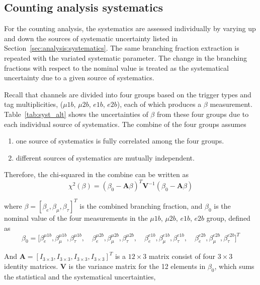 \FloatBarrier



\subsection{Counting analysis systematics}

For the counting analysis, the systematics are assessed individually by
varying up and down the sources of systematic uncertainty listed in
Section~\ref{sec:analysis:systematics}. The same branching fraction 
extraction is repeated with the variated systematic parameter.
The change in the branching fractions 
with respect to the nominal value is treated as the systematical uncertainty
due to a given source of systematics.

Recall that channels are divided into 
four groups based on the trigger types and \PQb tag multiplicities,
($\mu1b$, $\mu2b$, $e1b$, $e2b$), each of which produces a $\beta$ measurement. 
Table~\ref{tab:syst_alt} shows the 
uncertainties of $\beta$ from these four groups due to each individual source of systematics.
The combine of the four groups assumes
\begin{enumerate}
    \item one source of systematics is fully correlated among the four groups.
    \item different sources of systematics are mutually independent.
\end{enumerate}

\noindent Therefore, the chi-squared in the combine can be written as
\begin{equation}
    \chi^2 (\beta) = (\beta_0 - \textbf{A} \beta )^T \textbf{V}^{-1} (\beta_0 - \textbf{A} \beta )
\end{equation}

\noindent where $\beta = [\beta_e, \beta_\mu, \beta_\tau]^T $ is the combined branching fraction, and
$\beta_0$ is the nominal value of the four measurements in the $\mu1b$, $\mu2b$, $e1b$, $e2b$ group, defined as
% 
\begin{equation}
    \beta_0 = \bigg [
    \beta_e^{\mu1b}, \beta_\mu^{\mu1b}, \beta_\tau^{\mu1b}, \quad 
    \beta_e^{\mu2b}, \beta_\mu^{\mu2b}, \beta_\tau^{\mu2b}, \quad 
    \beta_e^{e1b}, \beta_\mu^{e1b}, \beta_\tau^{e1b}, \quad
    \beta_e^{e2b}, \beta_\mu^{e2b}, \beta_\tau^{e2b}
    \bigg ]^T
\end{equation}

\noindent And $\textbf{A}=[I_{3\times3}, I_{3\times3}, I_{3\times3}, I_{3\times3}]^T$ is a $12 \times 3$ 
matrix consist of four $3\times 3$ identity matrices. $\textbf{V}$ is the variance matrix for the 12 
elements in $\beta_0$, which sums the statistical and the systematical uncertainties,

